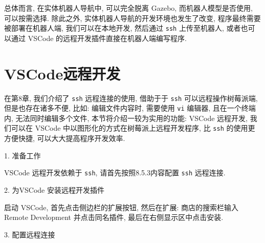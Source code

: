 \documentclass[openany, fontset=windowsold]{ctexbook}
\theoremstyle{kaiti}
\theoremstyle{normal}
\begin{document}

总体而言, 在实体机器人导航中, 可以完全脱离 Gazebo, 而机器人模型是否使用, 可以按需选择. 除此之外, 实体机器人导航的开发环境也发生了改变, 程序最终需要被部署在机器人端, 我们可以在本地开发, 然后通过 \verb|ssh| 上传至机器人, 或者也可以通过 VSCode 的远程开发插件直接在机器人端编写程序.

\section{VSCode远程开发}

在第8章, 我们介绍了 \verb|ssh| 远程连接的使用, 借助于于 \verb|ssh| 可以远程操作树莓派端, 但是也存在诸多不便, 比如: 编辑文件内容时, 需要使用 \verb|vi| 编辑器, 且在一个终端内, 无法同时编辑多个文件, 本节将介绍一较为实用的功能: VSCode 远程开发, 我们可以在 VSCode 中以图形化的方式在树莓派上远程开发程序, 比 \verb|ssh| 的使用更方便快捷, 可以大大提高程序开发效率.

1. 准备工作

VSCode 远程开发依赖于 \verb|ssh|, 请首先按照8.5.3内容配置 \verb|ssh| 远程连接.

2. 为VSCode 安装远程开发插件

启动 VSCode, 首先点击侧边栏的扩展按钮, 然后在扩展: 商店的搜索栏输入 Remote Development 并点击同名插件, 最后在右侧显示区中点击安装.

3. 配置远程连接
\end{document}
